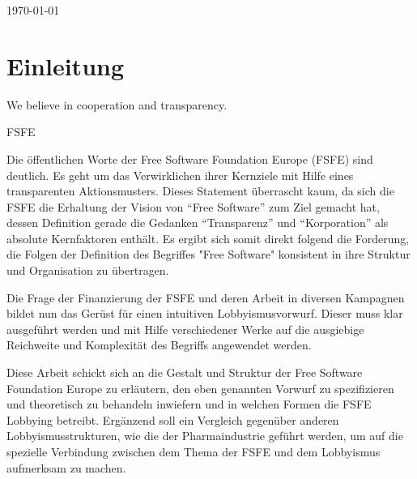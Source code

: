\begin{titlepage}

{\large \today}\\[3cm] %




\vfill %

\end{titlepage}

\section{Einleitung}
\epigraph{We believe in cooperation and transparency.}{FSFE}
Die öffentlichen Worte der Free Software Foundation Europe (FSFE) sind deutlich. Es geht
um das Verwirklichen ihrer Kernziele mit Hilfe eines transparenten Aktionsmusters.
Dieses Statement überrascht kaum, da sich die FSFE die Erhaltung der Vision von ``Free Software'' zum Ziel gemacht hat, dessen Definition gerade die Gedanken ``Transparenz'' und ``Korporation'' als absolute Kernfaktoren enthält. Es ergibt sich somit direkt folgend die Forderung, die Folgen der Definition des Begriffes "Free Software" konsistent in ihre Struktur und Organisation zu übertragen.

Die Frage der Finanzierung der FSFE und deren Arbeit in diversen
Kampagnen bildet nun das Gerüst für einen intuitiven Lobbyismusvorwurf. Dieser muss klar ausgeführt werden und mit Hilfe
verschiedener Werke auf die ausgiebige Reichweite und Komplexität
des Begriffs angewendet werden.

Diese Arbeit schickt sich an die Gestalt und Struktur der Free Software Foundation Europe zu erläutern, den eben genannten Vorwurf zu spezifizieren und theoretisch zu behandeln inwiefern und in welchen Formen die FSFE Lobbying betreibt. Ergänzend soll ein Vergleich gegenüber anderen Lobbyismusstrukturen,
wie die der Pharmaindustrie geführt werden, um auf die spezielle Verbindung zwischen dem Thema der FSFE und dem Lobbyismus aufmerksam zu machen.

